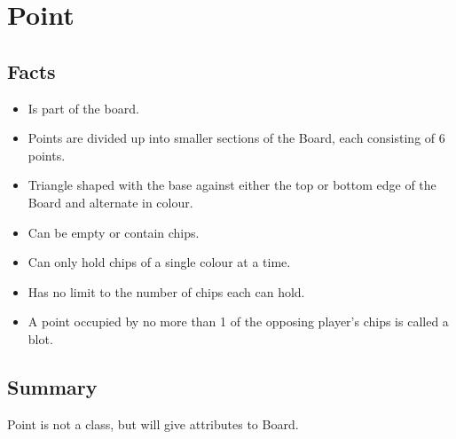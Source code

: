 \section{Point}

\subsection{Facts}

\begin{itemize} [itemsep=2pt,parsep=2pt]
    \item Is part of the board.
    \item Points are divided up into smaller sections of the Board, each consisting of 6 points.
    \item Triangle shaped with the base against either the top or bottom edge of the Board and alternate in colour.
    \item Can be empty or contain chips.
    \item Can only hold chips of a single colour at a time.
    \item Has no limit to the number of chips each can hold.
    \item A point occupied by no more than 1 of the opposing player’s chips is called a blot.
\end{itemize}


\subsection{Summary}
Point is not a class, but will give attributes to Board.
